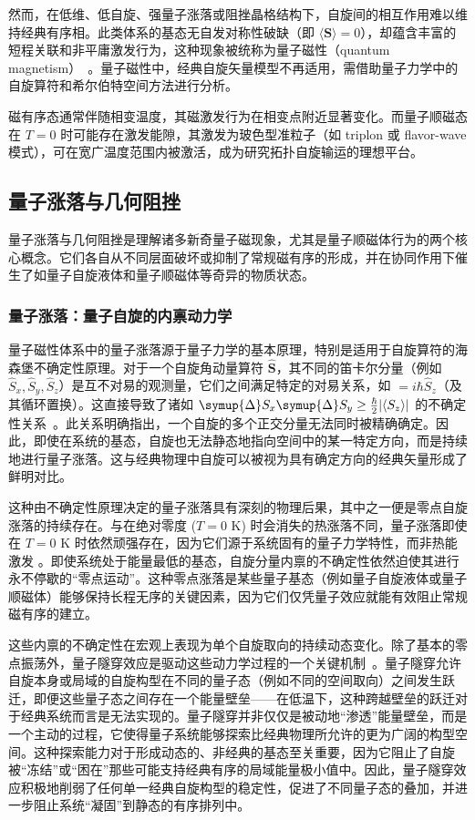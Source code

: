 然而，在低维、低自旋、强量子涨落或阻挫晶格结构下，自旋间的相互作用难以维持经典有序相。此类体系的基态无自发对称性破缺（即 $\langle \mathbf{S} \rangle = 0$），却蕴含丰富的短程关联和非平庸激发行为，这种现象被统称为量子磁性（quantum magnetism）~\cite{knolle2019Field,rau2016SpinOrbit}。量子磁性中，经典自旋矢量模型不再适用，需借助量子力学中的自旋算符和希尔伯特空间方法进行分析。

磁有序态通常伴随相变温度，其磁激发行为在相变点附近显著变化。而量子顺磁态在 $T=0$ 时可能存在激发能隙，其激发为玻色型准粒子（如 triplon 或 flavor-wave 模式），可在宽广温度范围内被激活，成为研究拓扑自旋输运的理想平台。

\subsection{量子涨落与几何阻挫}

量子涨落与几何阻挫是理解诸多新奇量子磁现象，尤其是量子顺磁体行为的两个核心概念。它们各自从不同层面破坏或抑制了常规磁有序的形成，并在协同作用下催生了如量子自旋液体和量子顺磁体等奇异的物质状态。

\subsubsection{量子涨落：量子自旋的内禀动力学}

量子磁性体系中的量子涨落源于量子力学的基本原理，特别是适用于自旋算符的海森堡不确定性原理。对于一个自旋角动量算符 $\hat{\mathbf{S}}$，其不同的笛卡尔分量（例如 $\hat{S}_x, \hat{S}_y, \hat{S}_z$）是互不对易的观测量，它们之间满足特定的对易关系，如 $ = i\hbar \hat{S}_z$（及其循环置换）。这直接导致了诸如 $\symup{\Delta} S_x \symup{\Delta} S_y \geq \frac{\hbar}{2} |\langle S_z \rangle|$ 的不确定性关系~\cite{lacroix2011Introduction}。此关系明确指出，一个自旋的多个正交分量无法同时被精确确定。因此，即使在系统的基态，自旋也无法静态地指向空间中的某一特定方向，而是持续地进行量子涨落。这与经典物理中自旋可以被视为具有确定方向的经典矢量形成了鲜明对比。

这种由不确定性原理决定的量子涨落具有深刻的物理后果，其中之一便是零点自旋涨落的持续存在。与在绝对零度 ($T=0$ K) 时会消失的热涨落不同，量子涨落即使在 $T=0$ K 时依然顽强存在，因为它们源于系统固有的量子力学特性，而非热能激发 \cite{matsuda2025Kitaev}。即使系统处于能量最低的基态，自旋分量内禀的不确定性依然迫使其进行永不停歇的“零点运动”。这种零点涨落是某些量子基态（例如量子自旋液体或量子顺磁体）能够保持长程无序的关键因素，因为它们仅凭量子效应就能有效阻止常规磁有序的建立。

这些内禀的不确定性在宏观上表现为单个自旋取向的持续动态变化。除了基本的零点振荡外，量子隧穿效应是驱动这些动力学过程的一个关键机制~\cite{kleinherbers2023Unraveling}。量子隧穿允许自旋本身或局域的自旋构型在不同的量子态（例如不同的空间取向）之间发生跃迁，即便这些量子态之间存在一个能量壁垒——在低温下，这种跨越壁垒的跃迁对于经典系统而言是无法实现的。量子隧穿并非仅仅是被动地“渗透”能量壁垒，而是一个主动的过程，它使得量子系统能够探索比经典物理所允许的更为广阔的构型空间。这种探索能力对于形成动态的、非经典的基态至关重要，因为它阻止了自旋被“冻结”或“困在”那些可能支持经典有序的局域能量极小值中。因此，量子隧穿效应积极地削弱了任何单一经典自旋构型的稳定性，促进了不同量子态的叠加，并进一步阻止系统“凝固”到静态的有序排列中。

